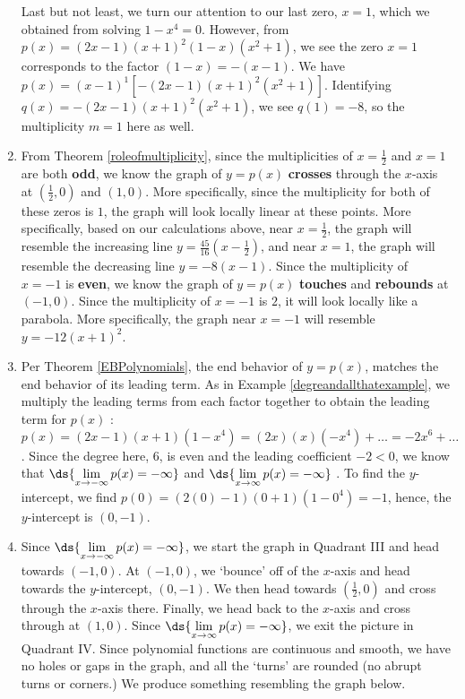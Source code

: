 \documentclass{ximera}
\begin{document}
\begin{example}
\begin{enumerate}
Last but not least, we turn our attention to our last zero, $x = 1$, which we obtained from solving $1-x^4=0$.  However, from $p(x) =  (2x-1)(x+1)^2(1-x)(x^2+1)$, we see the zero $x=1$ corresponds to the factor $(1-x) = -(x-1)$.  We have $p(x) = (x-1)^{1}\left[- (2x-1)(x+1)^2(x^2+1)\right]$.  Identifying $q(x) = - (2x-1)(x+1)^2(x^2+1)$, we see $q(1) = -8$, so the multiplicity $m = 1$ here as well.  


\item  From Theorem \ref{roleofmultiplicity}, since the multiplicities of $x = \frac{1}{2}$ and $x = 1$ are both \textbf{odd}, we know the graph of $y = p(x)$ \textbf{crosses} through the $x$-axis at $(\frac{1}{2}, 0)$ and $(1,0)$. More specifically, since the multiplicity for both of these zeros is $1$,  the graph will look locally linear at these points. More specifically, based on our calculations above, near $x = \frac{1}{2}$, the graph will resemble the increasing line $y =  \frac{45}{16} (x - \frac{1}{2})$, and near  $x = 1$, the graph will resemble the decreasing line $y = -8(x-1)$.    Since the multiplicity of $x = -1$ is \textbf{even}, we know the graph of $y = p(x)$ \textbf{touches} and  \textbf{rebounds} at $(-1,0)$.   Since the multiplicity of $x=-1$ is $2$, it will look locally like a parabola.   More specifically, the graph near $x = -1$ will resemble $y = -12(x+1)^2$.

\item  Per Theorem \ref{EBPolynomials}, the end behavior of $y =p(x)$, matches the end behavior of its leading term.  As in Example \ref{degreandallthatexample}, we multiply the leading terms from each factor together to obtain the leading term for $p(x)$ :   $p(x) = (2x-1)(x+1)(1-x^4) = (2x)(x)(-x^4) + \ldots = -2x^6 + \ldots$.  Since the degree here, $6$, is even and the leading coefficient $-2 <0$, we know that $\ds{\lim_{x \rightarrow - \infty} p(x) =  -\infty}$ and $\ds{\lim_{x \rightarrow  \infty} p(x) =  -\infty}$ .  To find the $y$-intercept, we find $p(0) = (2(0)-1)(0+1)(1-0^4) = -1$, hence, the $y$-intercept is $(0,-1)$.  

\item  Since  $\ds{\lim_{x \rightarrow - \infty} p(x) =  -\infty}$,  we start the graph in Quadrant III and head towards $(-1,0)$. At $(-1,0)$, we `bounce' off of the $x$-axis and head towards the $y$-intercept, $(0,-1)$.  We then head towards $\left(\frac{1}{2}, 0 \right)$ and cross through the $x$-axis there.  Finally, we head back to the $x$-axis and cross through at $(1,0)$.  Since $\ds{\lim_{x \rightarrow  \infty} p(x) =  -\infty}$,  we exit the picture in Quadrant IV.  Since polynomial functions are continuous and smooth, we have no holes or gaps in the graph, and all the `turns' are rounded (no abrupt turns or corners.)  We produce something resembling the graph below.


\end{enumerate}
\end{example}
\end{document}
